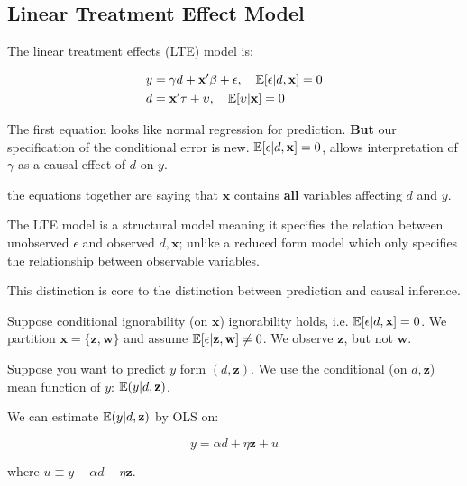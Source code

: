 \documentclass[11pt]{article}
\begin{document}
\subsection{Linear Treatment Effect Model}

The linear treatment effects (LTE) model is:

\begin{align*}
    y &= \gamma d + \mathbf{x^\prime}\beta + \epsilon, \quad \mathbb{E}[\epsilon|d,\mathbf{x}] = 0 \\
    d &= \mathbf{x^\prime}\tau + \upsilon, \quad \mathbb{E}[\upsilon|\mathbf{x}] = 0
\end{align*}

The first equation looks like normal regression for prediction. \textbf{But} our specification of the conditional error is new. $\mathbb{E}[\epsilon|d,\mathbf{x}] = 0$, allows interpretation of $\gamma$ as a causal effect of $d$ on $y$. 

the equations together are saying that $\mathbf{x}$ contains \textbf{all} variables affecting $d$ and $y$.

\begin{note}
    The LTE model is a structural model meaning it specifies the relation between unobserved $\epsilon$ and observed $d,\mathbf{x}$; unlike a reduced form model which only specifies the relationship between observable variables.

    This distinction is core to the distinction between prediction and causal inference.
\end{note}

\begin{procedure}
    \hspace{1in}
    Suppose conditional ignorability (on $\mathbf{x}$) ignorability holds, i.e. $\mathbb{E}[\epsilon|d,\mathbf{x}] = 0$. We partition $\mathbf{x} = \{\mathbf{z,w}\}$ and assume $\mathbb{E}[\epsilon|\mathbf{z},\mathbf{w}]\neq 0$. We observe $\mathbf{z}$, but not $\mathbf{w}$.

    Suppose you want to predict $y$ form $(d,\mathbf{z})$. We use the conditional (on $d,\mathbf{z}$) mean function of $y$: $\mathbb{E}(y|d,\mathbf{z})$.

    We can estimate $\mathbb{E}(y|d,\mathbf{z})$ by OLS on:

    \begin{equation}
        \label{LTE OLS}
        y = \alpha d + \eta \mathbf{z} + u
    \end{equation}

    where $u \equiv y - \alpha d - \eta \mathbf{z}$.
\end{procedure}
\end{document}

